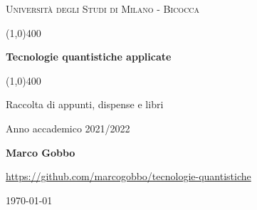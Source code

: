 \documentclass[a4paper, 12pt]{book}
\numberwithin{equation}{section}
\numberwithin{figure}{chapter}
\begin{document}
    \begin{titlepage}
        \begin{center}
            \vspace*{5cm}
            {\scshape\LARGE Università degli Studi di Milano - Bicocca \par}
            \vspace{1.0cm}
            \line(1,0){400} \\
            {\huge\bfseries Tecnologie quantistiche applicate \par}
            \line(1,0){400} \\
 	        \vspace{0.5cm}
            {\Large Raccolta di appunti, dispense e libri \par}
            \vspace{1.0cm}
            {Anno accademico 2021/2022 \par}
            \vspace{0.5cm}
            {\bfseries Marco Gobbo\par}
            \vspace{0.5cm}
            {\url{https://github.com/marcogobbo/tecnologie-quantistiche} \par}
            \vspace*{\fill}
            {\large \today \par}
        \end{center}
    \end{titlepage}
    \tableofcontents
    
    
    
\end{document}
